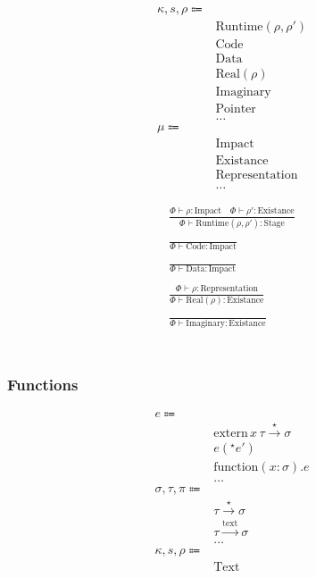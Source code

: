 \documentclass {article}
\begin{document}
\begin{align*}
\kappa, s, \rho \Coloneqq & \\
& \text{Runtime} (\rho, \rho') \tag{Runtime Stage}\\
& \text{Code} \tag{Code Impact}\\
& \text{Data} \tag{Data Impact}\\
& \text{Real} (\rho) \tag{Real Existance} \\
& \text{Imaginary} \tag{Imaginary Existance} \\
& \text{Pointer} \tag{Pointer Representation}\\
& \dots \\
\mu \Coloneqq & \\
& \text{Impact} \\
& \text{Existance} \\
& \text{Representation} \\
& \dots
\end{align*}

\begin{gather*}
\frac
{\Phi \vdash \rho : \text{Impact} \quad \Phi \vdash \rho' : \text{Existance}}
{\Phi \vdash \text{Runtime} (\rho, \rho') : \text{Stage}} \\
\\
\frac
{}
{\Phi \vdash \text{Code} : \text{Impact}} \\
\\
\frac
{}
{\Phi \vdash \text{Data} : \text{Impact}} \\
\\
\frac
{\Phi \vdash \rho : \text{Representation}}
{\Phi \vdash \text{Real} (\rho) : \text{Existance}} \\
\\
\frac
{}
{\Phi \vdash \text{Imaginary} : \text{Existance}} \\
\end{gather*}

\begin{gather*}
\end{gather*}

\subsubsection{Functions}

\begin{align*}
e \Coloneqq & \\
& \text{extern} \, x \, \tau \xrightarrow{\star} \sigma \tag{Extern Symbol} \\
& e(^\star e') \tag{Function Pointer Application} \\
& \text{function} (x : \sigma). e \tag{Function Literal} \\
& \dots \\
\sigma, \tau, \pi \Coloneqq & \\
& \tau \xrightarrow{\star} \sigma \tag{Function Pointer}\\
& \tau \xrightarrow{\text{text}} \sigma  \tag{Function Literal Type} \\
& \dots \\
\kappa, s, \rho \Coloneqq & \\
& \text{Text} \tag{Symbol Stage} \\
\end{align*}
\end{document}
